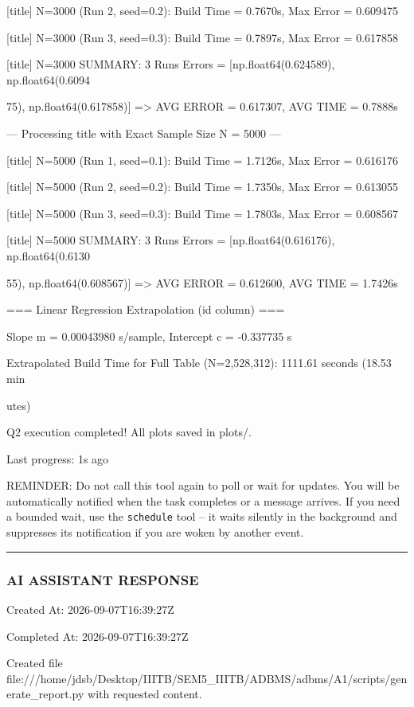 \documentclass[11pt,a4paper]{article}
\begin{document}
[title] N=3000 (Run 2, seed=0.2): Build Time = 0.7670s, Max Error = 0.609475

[title] N=3000 (Run 3, seed=0.3): Build Time = 0.7897s, Max Error = 0.617858

[title] N=3000 SUMMARY: 3 Runs Errors = [np.float64(0.624589), np.float64(0.6094

75), np.float64(0.617858)] => AVG ERROR = 0.617307, AVG TIME = 0.7888s

--- Processing title with Exact Sample Size N = 5000 ---

[title] N=5000 (Run 1, seed=0.1): Build Time = 1.7126s, Max Error = 0.616176

[title] N=5000 (Run 2, seed=0.2): Build Time = 1.7350s, Max Error = 0.613055

[title] N=5000 (Run 3, seed=0.3): Build Time = 1.7803s, Max Error = 0.608567

[title] N=5000 SUMMARY: 3 Runs Errors = [np.float64(0.616176), np.float64(0.6130

55), np.float64(0.608567)] => AVG ERROR = 0.612600, AVG TIME = 1.7426s

=== Linear Regression Extrapolation (id column) ===

Slope m = 0.00043980 s/sample, Intercept c = -0.337735 s

Extrapolated Build Time for Full Table (N=2,528,312): 1111.61 seconds (18.53 min

utes)

Q2 execution completed! All plots saved in plots/.


Last progress: 1s ago



REMINDER: Do not call this tool again to poll or wait for updates. You will be automatically notified when the task completes or a message arrives. If you need a bounded wait, use the \texttt{schedule} tool -- it waits silently in the background and suppresses its notification if you are woken by another event.


\hrule

\subsubsection{AI ASSISTANT RESPONSE}

Created At: 2026-09-07T16:39:27Z

Completed At: 2026-09-07T16:39:27Z

Created file file:///home/jdsb/Desktop/IIITB/SEM5\_IIITB/ADBMS/adbms/A1/scripts/generate\_report.py with requested content.
\end{document}
